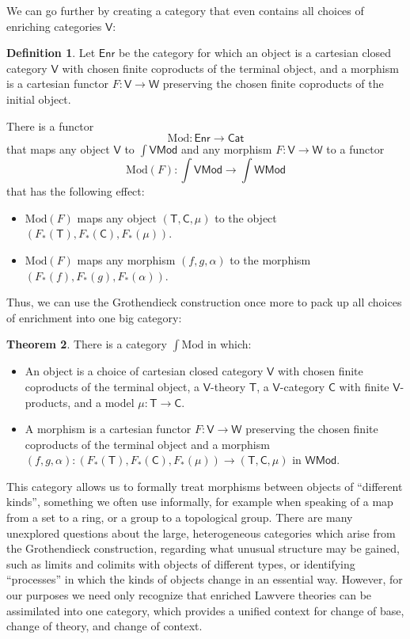 \documentclass{amsart}
\theoremstyle{definition}
\newtheorem{theorem}{Theorem}
\newtheorem{definition}[theorem]{Definition}
\newcommand{\Cat}{\mathsf{Cat}}
\newcommand{\Mod}{\mathsf{Mod}}
\newcommand{\Enr}{\mathsf{Enr}}
\newcommand{\V}{\mathsf{V}}
\newcommand{\W}{\mathsf{W}}
\newcommand{\C}{\mathsf{C}}
\newcommand{\T}{\mathsf{T}}
\newcommand{\maps}{\colon}
\begin{document}
We can go further by creating a category that even contains all choices of enriching 
categories $\V$:

\begin{definition}
\label{defn:enrichment}
Let $\Enr$ be the category for which an object is a cartesian closed category $\V$ with chosen finite coproducts of the terminal object, and a morphism is a cartesian
 functor $F \maps \V \to \W$ preserving the chosen finite coproducts of 
the initial object.   
\end{definition}

There is a functor 
\[   \mathrm{Mod} \maps \Enr \to \Cat \]
that maps any object $\V$ to $\int \V\Mod$ and any morphism $F \maps \V \to \W$ to a functor 
\[    \mathrm{Mod}(F) \maps \textstyle{\int \V\Mod \to \int \W\Mod} \]
that has the following effect:
\begin{itemize}
\item  $\mathrm{Mod}(F)$ maps any object $(\T,\C,\mu)$ to
the object $(F_*(\T),F_*(\C),F_*(\mu))$. 
\item $\mathrm{Mod}(F)$ maps any morphism $ (f,g,\alpha)$
to the morphism $(F_*(f),F_*(g),F_*(\alpha))$. 
\end{itemize}
Thus, we can use the Grothendieck construction once more to pack up all choices of 
enrichment into one big category:

\begin{theorem}
There is a category $\int \mathrm{Mod}$ in which:
\begin{itemize}
\item An object is a choice of cartesian closed category $\V$ with chosen finite coproducts
of the terminal object, a $\V$-theory $\T$, a  $\V$-category $\C$ with finite $\V$-products, and a model $\mu \maps \T \to \C$.
\item A morphism is a cartesian functor $F \maps \V \to \W$ preserving the chosen finite
coproducts of the terminal object and a morphism $(f,g,\alpha) \maps (F_*(\T), F_*(\C), F_*(\mu)) \to (\T,\C,\mu)$ in $\W\Mod$.
\end{itemize}
\end{theorem}

This category allows us to formally treat morphisms between objects of ``different kinds'', something we often use informally, for example when speaking of a map from a set to a ring, or a group to a topological group.   There are many unexplored questions about the large, heterogeneous categories which arise from the Grothendieck construction, regarding what unusual structure may be gained, such as limits and colimits with objects of different types, or identifying ``processes'' in which the kinds of objects change in an essential way. However, for our purposes we need only recognize that enriched Lawvere theories can be assimilated into one category, which provides a unified context for change of base, change of theory, and change of context.
\end{document}
